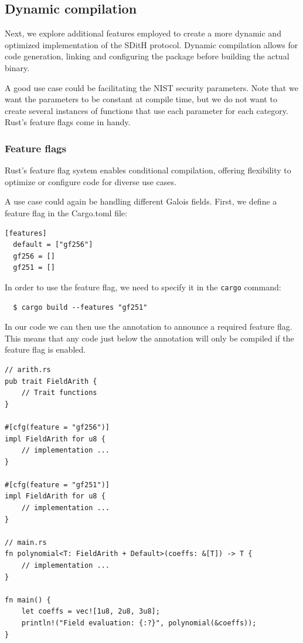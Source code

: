 \documentclass[11pt]{report}
\theoremstyle{definition}
\theoremstyle{plain}
\begin{document}
\subsection{Dynamic compilation}

Next, we explore additional features employed to create a more dynamic and optimized implementation of the SDitH protocol. Dynamic compilation allows for code generation, linking and configuring the package before building the actual binary.

A good use case could be facilitating the NIST security parameters. Note that we want the parameters to be constant at compile time, but we do not want to create several instances of functions that use each parameter for each category. Rust's feature flags come in handy.

\subsubsection{Feature flags}\label{prelim:feature_flags}
Rust's feature flag system enables conditional compilation, offering flexibility to optimize or configure code for diverse use cases.

A use case could again be handling different Galois fields. First, we define a feature flag in the Cargo.toml file:

\begin{verbatim}
[features]
  default = ["gf256"]
  gf256 = []
  gf251 = []
\end{verbatim}

In order to use the feature flag, we need to specify it in the \texttt{cargo} command:

\begin{verbatim}
  $ cargo build --features "gf251"
\end{verbatim}

In our code we can then use the  annotation to announce a required feature flag. This means that any code just below the annotation will only be compiled if the feature flag is enabled.

\begin{verbatim}
// arith.rs
pub trait FieldArith {
    // Trait functions
}

#[cfg(feature = "gf256")]
impl FieldArith for u8 {
    // implementation ...
}

#[cfg(feature = "gf251")]
impl FieldArith for u8 {
    // implementation ...
}

// main.rs
fn polynomial<T: FieldArith + Default>(coeffs: &[T]) -> T {
    // implementation ...
}

fn main() {
    let coeffs = vec![1u8, 2u8, 3u8];
    println!("Field evaluation: {:?}", polynomial(&coeffs));
}
\end{verbatim}
\end{document}
